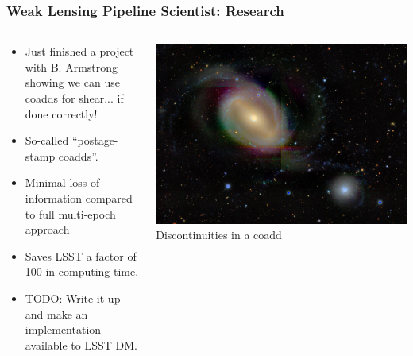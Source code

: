 \documentclass[aspectratio=169]{beamer}
\begin{document}
\frame
{

    \frametitle{Weak Lensing Pipeline Scientist: Research}


    \begin{columns}
        \begin{column}{0.5\textwidth}

            \begin{itemize}

                \item Just finished a project with B. Armstrong showing we can use coadds
                    for shear... if done correctly!
                    
                \item So-called ``postage-stamp
                    coadds''.
                    
                \item Minimal loss of information compared to full multi-epoch
                    approach

                \item Saves LSST a factor of 100 in computing
                    time.
                    
                \item TODO: Write it up and make an implementation
                    available to LSST DM.

            \end{itemize}
        \end{column}
        \begin{column}{0.5\textwidth}
            \begin{center}
                \includegraphics[width=\textwidth,angle=90]{DES0402-4331-discont.jpg}
                \newline
                {\tiny Discontinuities in a coadd }
            \end{center}
        \end{column}

    \end{columns}

}
\end{document}
